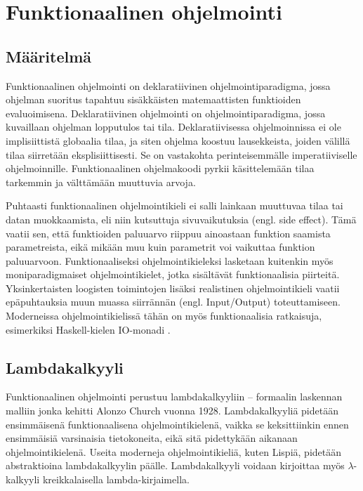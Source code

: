 \chapter{Funktionaalinen ohjelmointi} \label{Funktionaalinen ohjelmointi}

\section{Määritelmä}
Funktionaalinen ohjelmointi on deklaratiivinen ohjelmointiparadigma, jossa ohjelman suoritus tapahtuu sisäkkäisten
matemaattisten funktioiden evaluoimisena. Deklaratiivinen ohjelmointi on ohjelmointiparadigma, jossa kuvaillaan ohjelman
lopputulos tai tila. Deklaratiivisessa ohjelmoinnissa ei ole implisiittistä globaalia tilaa, ja siten ohjelma koostuu
lausekkeista, joiden välillä tilaa siirretään eksplisiittisesti. Se on vastakohta perinteisemmälle imperatiiviselle 
ohjelmoinnille. Funktionaalinen ohjelmakoodi pyrkii käsittelemään tilaa tarkemmin ja välttämään muuttuvia
arvoja. \cite{hudak}

Puhtaasti funktionaalinen ohjelmointikieli ei salli lainkaan muuttuvaa tilaa tai datan muokkaamista, eli niin kutsuttuja
sivuvaikutuksia (engl. side effect). Tämä vaatii sen, että funktioiden paluuarvo riippuu ainoastaan funktion saamista
parametreista, eikä mikään muu kuin parametrit voi vaikuttaa funktion paluuarvoon. Funktionaaliseksi ohjelmointikieleksi
lasketaan kuitenkin myös moniparadigmaiset ohjelmointikielet, jotka sisältävät funktionaalisia piirteitä.
Yksinkertaisten loogisten toimintojen lisäksi realistinen ohjelmointikieli vaatii epäpuhtauksia muun muassa siirrännän
(engl. Input/Output) toteuttamiseen. \cite{purelyFunctional} Moderneissa ohjelmointikielissä tähän on myös
funktionaalisia ratkaisuja, esimerkiksi Haskell-kielen IO-monadi \cite{learnhaskell}.

\section{Lambdakalkyyli}
Funktionaalinen ohjelmointi perustuu lambdakalkyyliin – formaalin laskennan malliin jonka kehitti Alonzo Church vuonna
1928. Lambdakalkyyliä pidetään ensimmäisenä funktionaalisena ohjelmointikielenä, vaikka se keksittiinkin ennen
ensimmäisiä varsinaisia tietokoneita, eikä sitä pidettykään aikanaan ohjelmointikielenä. Useita moderneja
ohjelmointikieliä, kuten Lispiä, pidetään abstraktioina lambdakalkyylin päälle. Lambdakalkyyli voidaan kirjoittaa myös
$ \lambda $-kalkyyli kreikkalaisella lambda-kirjaimella. \cite{hudak}

